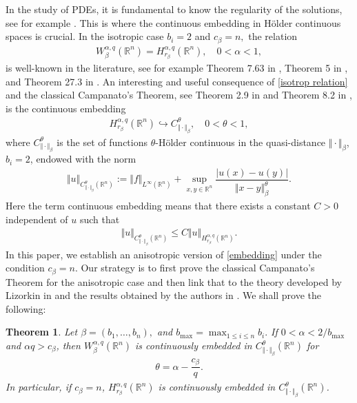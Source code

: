\documentclass[10pt, leqno]{article}
\newtheorem{theorem}{Theorem}[section]
\theoremstyle{definition}
\theoremstyle{remark}
\numberwithin{equation}{section}
\begin{document}
In the study of PDEs, it is fundamental to know the regularity of the solutions, see for example \cite{S, CS, CLU, ROS-OTON-SERRA 1, ROS-OTON-SERRA 2, LTY, CTU, SL, CKP}. This is where the continuous embedding in H\"{o}lder continuous spaces is crucial. In the isotropic case $b_{i} = 2$ and $c_{\beta} = n,$ the relation
\begin{eqnarray}
\label{isotrop relation}
W_{\beta}^{\alpha, q}(\mathbb{R}^{n}) = H_{r_{\beta}}^{\alpha, q}(\mathbb{R}^{n}), \quad 0 < \alpha < 1,
\end{eqnarray}
is well-known in the literature, see for example Theorem 7.63 in \cite{ADAMS}, Theorem 5 in \cite{STEIN}, and Theorem 27.3 in \cite{SAMKO}. An interesting and useful consequence of \eqref{isotrop relation} and the classical Campanato's Theorem, see Theorem 2.9 in \cite{E. GIUSTI} and Theorem 8.2 in \cite{NPV}, is the continuous embedding
\begin{eqnarray}
H_{r_{\beta}}^{\alpha, q}(\mathbb{R}^{n}) \hookrightarrow C^{\theta}_{\Vert \cdot \Vert_{\beta}}, \quad 0< \theta < 1,
\end{eqnarray}
where $C^{\theta}_{\Vert \cdot \Vert_{\beta}}$ is the set of functions $\theta$-H\" older continuous in the quasi-distance $\Vert \cdot \Vert_{\beta}$, $b_{i} = 2$, endowed with the norm
\begin{eqnarray}
\Vert u \Vert_{C^{\theta}_{\Vert \cdot \Vert_{\beta}}(\mathbb{R}^{n})} := \Vert f \Vert_{L^{\infty}(\mathbb{R}^{n})} + \displaystyle\sup_{x, y \in \mathbb{R}^{n}} \dfrac{\vert u(x) - u(y)\vert}{\Vert x - y \Vert_{\beta}^{\theta}}.
\end{eqnarray}
Here the term continuous embedding means that there exists a constant $C >0$ independent of $u$ such that
\begin{eqnarray}
\label{embedding}
\Vert u \Vert_{C^{\theta}_{\Vert \cdot \Vert_{\beta}}(\mathbb{R}^{n})} \leq C \Vert u \Vert_{H_{r_{\beta}}^{\alpha, q}(\mathbb{R}^{n})}.
\end{eqnarray}
In this paper, we establish an anisotropic version of \eqref{embedding} under the condition $c_{\beta} = n$. Our strategy is to first prove the classical Campanato's Theorem for the anisotropic case and then link that to the theory developed by Lizorkin in \cite{LIZORKIN 1, LIZORKIN 2, LIZORKIN 3} and the results obtained by the authors in \cite{LEITAO LP}. We shall prove the following:
\begin{theorem}
\label{main theorem}
Let $\beta = (b_{1}, \dots, b_{n}),$ and $b_{\max}=\displaystyle\max_{1\leq i\leq n}b_i.$ If $0 < \alpha < 2/b_{\max}$ and $\alpha q > c_{\beta}$, then $W_{\beta}^{\alpha, q}(\mathbb{R}^{n})$ is continuously embedded in $C^{\theta}_{\Vert \cdot \Vert_{\beta}}\left( \mathbb{R}^{n}\right)$ for
\begin{eqnarray}
\label{holder reg}
\theta = \alpha - \dfrac{c_{\beta}}{q}.
\end{eqnarray}
In particular, if $c_{\beta}=n$, $H_{r_{\beta}}^{\alpha, q}(\mathbb{R}^{n})$ is continuously embedded in $C^{\theta}_{\Vert \cdot \Vert_{\beta}}\left( \mathbb{R}^{n}\right)$.
\end{theorem}
\end{document}
